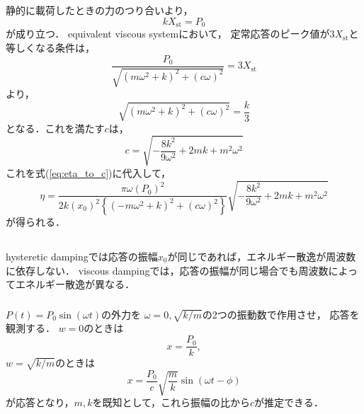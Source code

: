 \documentclass[a4paper]{jsarticle}
\begin{document}
\subsection{}
静的に載荷したときの力のつり合いより，
\begin{equation}
  k X_{\mathrm{st}} = P_0
\end{equation}
が成り立つ．
equivalent viscous systemにおいて，
定常応答のピーク値が$3 X_{\mathrm{st}}$と等しくなる条件は，
\begin{equation}
  \frac{P_0}{\sqrt{(m \omega^2 + k)^2 + (c \omega)^2}} = 3 X_{\mathrm{st}}
\end{equation}
より，
\begin{equation}
  \sqrt{(m \omega^2 + k)^2 + (c \omega)^2} = \frac{k}{3}
\end{equation}
となる．これを満たす$c$は，
\begin{equation}
  c = \sqrt{-\frac{8k^2}{9 \omega^2} + 2 m k + m^2 \omega^2}
\end{equation}
これを式(\ref{eq:eta_to_c})に代入して，
\begin{equation}
  \eta = \frac{\pi \omega \left(P_0\right)^2}{2 k \left(x_0\right)^2
    \left\{(-m \omega^2 + k)^2 + (c \omega)^2\right\}}
  \sqrt{-\frac{8k^2}{9\omega^2} + 2mk + m^2 \omega^2}
\end{equation}
が得られる．

\subsection{}
\subsubsection{}
hysteretic dampingでは応答の振幅$x_0$が同じであれば，エネルギー散逸が周波数に依存しない．
viscous dampingでは，応答の振幅が同じ場合でも周波数によってエネルギー散逸が異なる．
\subsubsection{}
$P(t) = P_0 \sin (\omega t)$の外力を
$\omega = 0, \sqrt{k / m}$の2つの振動数で作用させ，
応答を観測する．
$w = 0$のときは
\begin{equation}
  x = \frac{P_0}{k},
\end{equation}
$w = \sqrt{k / m}$のときは
\begin{equation}
  x =\frac{P_0}{c}\sqrt{\frac{m}{k}} \sin (\omega t - \phi)
\end{equation}
が応答となり，$m, k$を既知として，これら振幅の比から$c$が推定できる．
\end{document}
